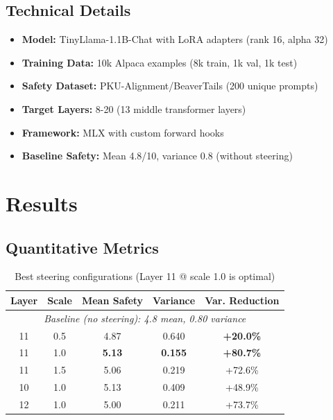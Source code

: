 \documentclass[11pt,a4paper]{article}
\begin{document}
\subsection*{Technical Details}
\begin{itemize}
    \item \textbf{Model:} TinyLlama-1.1B-Chat with LoRA adapters (rank 16, alpha 32)
    \item \textbf{Training Data:} 10k Alpaca examples (8k train, 1k val, 1k test)
    \item \textbf{Safety Dataset:} PKU-Alignment/BeaverTails (200 unique prompts)
    \item \textbf{Target Layers:} 8-20 (13 middle transformer layers)
    \item \textbf{Framework:} MLX with custom forward hooks
    \item \textbf{Baseline Safety:} Mean 4.8/10, variance 0.8 (without steering)
\end{itemize}

\section*{Results}

\subsection*{Quantitative Metrics}
\begin{table}[H]
\centering
\small
\begin{tabular}{@{}ccccc@{}}
\toprule
\textbf{Layer} & \textbf{Scale} & \textbf{Mean Safety} & \textbf{Variance} & \textbf{Var. Reduction} \\
\midrule
\multicolumn{5}{c}{\textit{Baseline (no steering): 4.8 mean, 0.80 variance}} \\
\midrule
11 & 0.5 & 4.87 & 0.640 & \textbf{+20.0\%} \\
11 & 1.0 & \textbf{5.13} & \textbf{0.155} & \textbf{+80.7\%} \\
11 & 1.5 & 5.06 & 0.219 & +72.6\% \\
\midrule
10 & 1.0 & 5.13 & 0.409 & +48.9\% \\
12 & 1.0 & 5.00 & 0.211 & +73.7\% \\
\bottomrule
\end{tabular}
\caption{Best steering configurations (Layer 11 @ scale 1.0 is optimal)}
\end{table}
\end{document}
